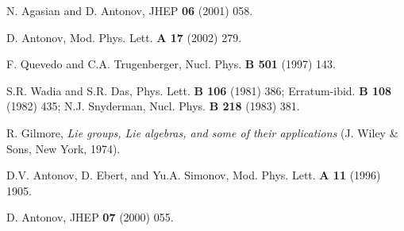 \documentclass[a4paper,12pt]{article}
\begin{document}
\begin{thebibliography}{99}
N. Agasian and D. Antonov, JHEP {\bf 06} (2001) 058.

D. Antonov, Mod. Phys. Lett. {\bf A 17} (2002) 279.

F. Quevedo and C.A. Trugenberger,
Nucl. Phys. {\bf B 501} (1997) 143.

S.R. Wadia and S.R. Das, Phys. Lett. {\bf B 106} (1981) 386; Erratum-ibid.
{\bf B 108} (1982) 435;
N.J. Snyderman, Nucl. Phys. {\bf B 218} (1983) 381.

R. Gilmore, {\it Lie groups, Lie algebras, and some of their applications}
(J. Wiley \& Sons, New York, 1974).


D.V. Antonov, D. Ebert, and Yu.A. Simonov, Mod. Phys. Lett. {\bf A 11} (1996) 1905.


D. Antonov, JHEP {\bf 07} (2000) 055.


\end{thebibliography}
\end{document}
